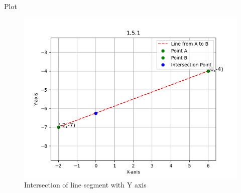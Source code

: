 \documentclass{beamer}
\begin{document}
\begin{frame}{Plot}
    \begin{figure}[H]
    \centering
    \includegraphics[width=0.6\columnwidth]{figs/fig1.png}
    \caption{Intersection of line segment with Y axis}
    \label{2D Plot}
\end{figure}
\end{frame}
\end{document}
